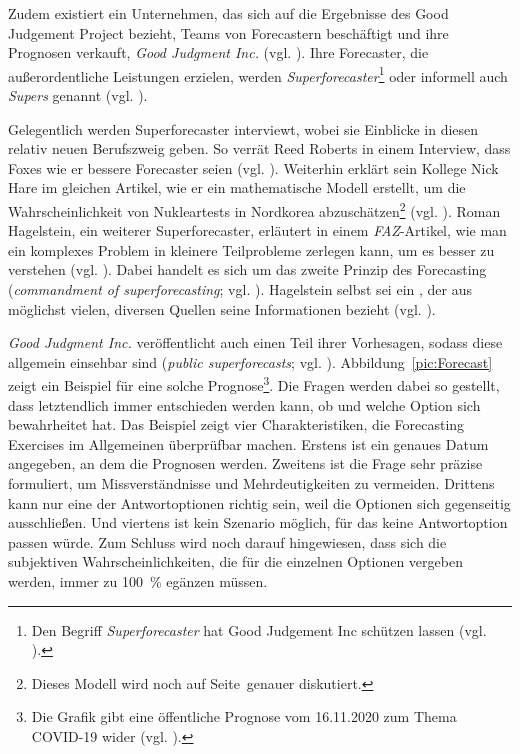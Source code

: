 Zudem existiert ein Unternehmen, das sich auf die Ergebnisse des Good Judgement Project bezieht,
Teams von Forecastern beschäftigt und ihre Prognosen verkauft, \emph{Good Judgment Inc.} (vgl. \cite{GJP_Ink}).
Ihre Forecaster, die außerordentliche Leistungen erzielen, werden \emph{Superforecaster}\footnote{
Den Begriff \emph{Superforecaster} hat Good Judgement Inc schützen lassen (vgl. \cite{Super}).
} oder informell auch \emph{Supers} genannt (vgl. \cite{Burton}).

Gelegentlich werden Superforecaster interviewt, wobei sie Einblicke in diesen
relativ neuen Berufszweig geben. So verrät Reed Roberts in einem Interview,
dass Foxes wie er bessere Forecaster seien (vgl. \cite{Burton}). Weiterhin erklärt sein Kollege Nick Hare im
gleichen Artikel, wie er ein mathematische Modell erstellt, um die Wahrscheinlichkeit von Nukleartests in
Nordkorea abzuschätzen\footnote{ 
Dieses Modell wird noch auf Seite~\xcom genauer diskutiert.
} (vgl. \cite{Burton}). Roman Hagelstein, ein weiterer Superforecaster,
erläutert in einem \emph{FAZ}-Artikel, wie man ein komplexes Problem in kleinere Teilprobleme zerlegen kann, um
es besser zu verstehen (vgl. \cite{Juergs}). Dabei handelt es sich um das zweite Prinzip des Forecasting
(\emph{commandment of superforecasting}; vgl. \cite{Jackson}). Hagelstein selbst 
sei ein \grqq{}, der aus möglichst vielen, diversen
Quellen seine Informationen bezieht (vgl. \cite{Juergs}).

\emph{Good Judgment Inc.} veröffentlicht auch einen Teil ihrer Vorhesagen, sodass diese
allgemein einsehbar sind (\emph{public superforecasts}; vgl. \cite{GJP_Ink}).
Abbildung~\ref{pic:Forecast} zeigt ein Beispiel für eine solche Prognose\footnote{
Die Grafik gibt eine öffentliche Prognose vom 16.11.2020 zum Thema COVID-19 wider (vgl. \cite{GJP_Ink_F}).
}. Die Fragen werden dabei so gestellt, dass letztendlich immer entschieden werden
kann, ob und welche Option sich bewahrheitet hat. Das Beispiel zeigt vier
Charakteristiken, die Forecasting Exercises im Allgemeinen überprüfbar machen.
Erstens ist ein genaues Datum angegeben, an dem die Prognosen \grqq{} werden.
Zweitens ist die Frage sehr präzise formuliert, um Missverständnisse und Mehrdeutigkeiten
zu vermeiden. Drittens kann nur eine der Antwortoptionen richtig sein, weil die Optionen
sich gegenseitig ausschließen. Und viertens ist kein Szenario möglich, für das keine
Antwortoption passen würde. Zum Schluss wird noch darauf hingewiesen, dass sich
die subjektiven Wahrscheinlichkeiten, die für die einzelnen Optionen vergeben werden,
immer zu 100~\% egänzen müssen.
 
